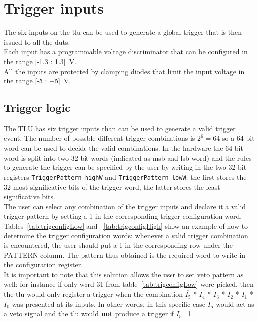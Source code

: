 \chapter{Trigger inputs}\label{ch:triggerinputs}
The six inputs on the \gls{tlu} can be used to generate a global trigger that is then issued to all the \gls{dut}s.\\
Each input has a programmable voltage discriminator that can be configured in the range [-1.3 : 1.3]~V.\\
All the inputs are protected by clamping diodes that limit the input voltage in the range [-5 : +5]~V.

\section{Trigger logic}\label{ch:triggerLogic}
The TLU has six trigger inputs than can be used to generate a valid trigger event. The number of possible different trigger combinations is $2^6= 64$ so a 64-bit word can be used to decide the valid combinations. In the hardware the 64-bit word is split into two 32-bit words (indicated as \gls{msb} and \gls{lsb} word) and the rules to generate the trigger can be specified by the user by writing in the two 32-bit registers \verb|TriggerPattern_highW| and \verb|TriggerPattern_lowW|: the first stores the 32 most significative bits of the trigger word, the latter stores the least significative bits.\\
The user can select any combination of the trigger inputs and declare it a valid trigger pattern by setting a 1 in the corresponding trigger configuration word.
Tables~\ref{tab:trigconfigLow} and ~\ref{tab:trigconfigHigh} show an example of how to determine the trigger configuration words: whenever a valid trigger combination is encountered, the user should put a 1 in the corresponding row under the PATTERN column. The pattern thus obtained is the required word to write in the configuration register.\\
It is important to note that this solution allows the user to set veto pattern as well: for instance if only word 31 from table~\ref{tab:trigconfigLow} were picked, then the \gls{tlu} would only register a trigger when the combination $\overline{I_{5}}$ * $I_{4}$ * $I_{3}$ * $I_{2}$ * $I_{1}$ * $I_{0}$ was presented at its inputs. In other words, in this specific case $I_{5}$ would act as a veto signal and the \gls{tlu} would \textbf{not} produce a trigger if $I_{5}$=1.

